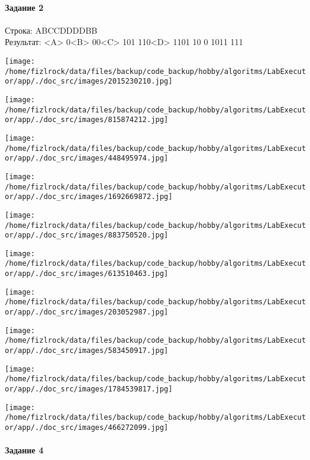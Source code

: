 \documentclass[a4paper, 12pt]{article}
\begin{document}
\paragraph{Задание 2}

Строка: 
ABCCDDDDBB\\
Результат: <A> 0<B> 00<C> 101 110<D> 1101 10 0 1011 111

\texttt{[image: /home/fizlrock/data/files/backup/code\_backup/hobby/algoritms/LabExecutor/app/./doc\_src/images/2015230210.jpg]}

\texttt{[image: /home/fizlrock/data/files/backup/code\_backup/hobby/algoritms/LabExecutor/app/./doc\_src/images/815874212.jpg]}

\texttt{[image: /home/fizlrock/data/files/backup/code\_backup/hobby/algoritms/LabExecutor/app/./doc\_src/images/448495974.jpg]}

\texttt{[image: /home/fizlrock/data/files/backup/code\_backup/hobby/algoritms/LabExecutor/app/./doc\_src/images/1692669872.jpg]}

\texttt{[image: /home/fizlrock/data/files/backup/code\_backup/hobby/algoritms/LabExecutor/app/./doc\_src/images/883750520.jpg]}

\texttt{[image: /home/fizlrock/data/files/backup/code\_backup/hobby/algoritms/LabExecutor/app/./doc\_src/images/613510463.jpg]}

\texttt{[image: /home/fizlrock/data/files/backup/code\_backup/hobby/algoritms/LabExecutor/app/./doc\_src/images/203052987.jpg]}

\texttt{[image: /home/fizlrock/data/files/backup/code\_backup/hobby/algoritms/LabExecutor/app/./doc\_src/images/583450917.jpg]}

\texttt{[image: /home/fizlrock/data/files/backup/code\_backup/hobby/algoritms/LabExecutor/app/./doc\_src/images/1784539817.jpg]}

\texttt{[image: /home/fizlrock/data/files/backup/code\_backup/hobby/algoritms/LabExecutor/app/./doc\_src/images/466272099.jpg]}
\pagebreak
\paragraph{Задание 4}
\end{document}
